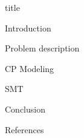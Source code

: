 \documentclass{article}
\begin{document}
{title}

\frontmatter

\tableofcontents


{Introduction}

{Problem description}

{CP Modeling}

{SMT}

{Conclusion}

{References}

\newpage
\printbibliography[heading = bibintoc, title = Bibliography]    %

\end{document}
